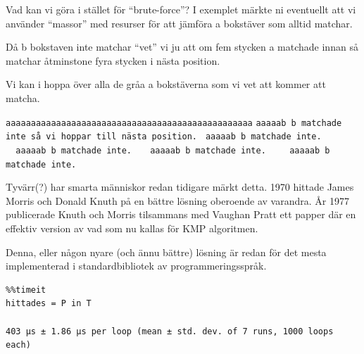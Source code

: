\documentclass[11pt, aspectratio=169, table]{beamer}
\begin{document}
\begin{frame}{Vad kan vi göra i stället för ``brute-force''?}
\vspace{-0.5cm}
I exemplet märkte ni eventuellt att vi använder ``massor'' med resurser för att jämföra a bokstäver som alltid matchar.

Då b bokstaven inte matchar ``vet'' vi ju att om fem stycken a matchade innan så matchar åtminstone fyra stycken i nästa position.

Vi kan i hoppa över alla de gråa a bokstäverna som vi vet att kommer att matcha.

\texttt{aaaaaaaaaaaaaaaaaaaaaaaaaaaaaaaaaaaaaaaaaaaaaaaaa}\linebreak
{\color{green}\texttt{aaaaa}}{\color{red}\texttt{b}}{\color{gray}\texttt{~b matchade inte så vi hoppar till nästa position.}}\linebreak
{\color{gray}\texttt{~aaaa}}{\color{green}\texttt{a}}{\color{red}\texttt{b}}{\color{gray}\texttt{~b matchade inte.}}\linebreak
{\color{gray}\texttt{~~aaaa}}{\color{green}\texttt{a}}{\color{red}\texttt{b}}{\color{gray}\texttt{~b matchade inte.}}\linebreak
{\color{gray}\texttt{~~~aaaa}}{\color{green}\texttt{a}}{\color{red}\texttt{b}}{\color{gray}\texttt{~b matchade inte.}}\linebreak
{\color{gray}\texttt{~~~~aaaa}}{\color{green}\texttt{a}}{\color{red}\texttt{b}}{\color{gray}\texttt{~b matchade inte.}}\linebreak
\end{frame}

\begin{frame}[fragile]{Tyvärr(?) har smarta människor redan tidigare märkt detta.}
\setlength{\parskip}{\fill}
1970 hittade James Morris och Donald Knuth på en bättre lösning oberoende av varandra. År 1977 publicerade Knuth och Morris 
tilsammans med Vaughan Pratt ett papper där en effektiv version av vad som nu kallas för \alert{KMP algoritmen}.

Denna, eller någon nyare (och ännu bättre) lösning är redan för det mesta implementerad i standardbibliotek av programmeringsspråk. 

\begin{verbatim}
%%timeit
hittades = P in T

403 µs ± 1.86 µs per loop (mean ± std. dev. of 7 runs, 1000 loops each)
\end{verbatim}
\end{frame}
\end{document}
